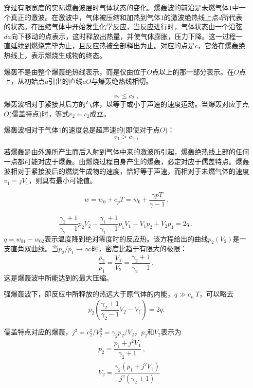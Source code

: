 \documentclass[12pt,a4paper]{article}
\begin{document}
穿过有限宽度的实际爆轰波层时气体状态的变化。爆轰波的前沿是未燃气体$1$中一个真正的激波。在激波中，气体被压缩和加热到气体$1$的激波绝热线上点$d$所代表的状态。在压缩气体中开始发生化学反应，当反应进行时，气体状态由一个沿弦$da$向下移动的点表示，这时释放出热量，并使气体膨胀，压力下降。这一过程一直延续到燃烧完毕为止，且反应热被全部释出为止。对应的点是$c$，它落在爆轰绝热线上，表示燃烧生成物的终态。


爆轰不是由整个爆轰绝热线表示，而是仅由位于$O$点以上的那一部分表示。在$O$点上，从初始点$a$引出的直线$aO$与爆轰绝热线相切。

\begin{equation}
v_2 \leqslant c_2 ~,
\end{equation}
爆轰波相对于紧接其后方的气体，以等于或小于声速的速度运动。当爆轰对应于点$O$(儒盖特点)时，等式$v_2 = c_2$成立。

爆轰波相对于气体$1$的速度总是超声速的(即使对于点$O$)：
\begin{equation}
v_1 > c_1 ~,
\end{equation}


若爆轰是由外源所产生而后入射到气体中来的激波所引起，爆轰绝热线上部的任何一点都可能对应于爆轰。由燃烧过程自身产生的爆轰，必定对应于儒盖特点。爆轰波相对于紧接波后的燃烧生成物的速度，恰好等于声速，而相对于未燃气体的速度$v_1 = j V_1$，则具有最小可能值。

\begin{equation*}
w = w_0 +c_p T = w_0 + \dfrac{\gamma p T}{\gamma -1} ~.
\end{equation*}

\begin{equation}
\dfrac{\gamma_2 +1}{\gamma_2 -1} p_2 V_2 -\dfrac{\gamma_1 +1}{\gamma_1 -1} p_1 V_1 - V_1 p_2 +V_2 p_1 = 2q ~,
\end{equation}
$q = w_{01} - w_{02}$表示温度降到绝对零度时的反应热。该方程给出的曲线$p_2(V_2)$是一支直角双曲线。当$p_2/p_1 \rightarrow \infty$时，密度比趋于有限大的极限：
\begin{equation*}
\dfrac{\rho_2}{\rho_1} = \dfrac{V_1}{V_2} = \dfrac{\gamma_2 +1}{\gamma_2 -1} ~,
\end{equation*}
这是爆轰波中所能达到的最大压缩。

强爆轰波下，即反应中所释放的热远大于原气体的内能，$q \gg c_{v_1} T$，可以略去
\begin{equation}
p_2 \left(\dfrac{\gamma_2 +1}{\gamma_2 -1} V_2 -V_1 \right) = 2q.
\end{equation}

儒盖特点对应的爆轰，$j^2 = c_2^2 /V_2^2 = \gamma_2 p_2/ V_2$，$p_2$和$V_2$表示为
\begin{align}
& p_2 = \dfrac{p_1 +j^2 V_1}{\gamma_2 +1} ~, \\
& V_2 = \dfrac{\gamma_2(p_1 +j^2 V_1)}{j^2(\gamma_2 +1)}
\end{align}
\end{document}
